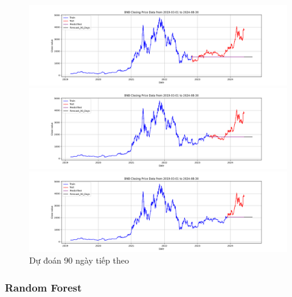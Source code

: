 \documentclass[conference]{IEEEtran}
\begin{document}
\begin{figure}[H]
    \centering
    \begin{minipage}{0.15\textwidth}
    \centering
    \includegraphics[width=1\textwidth]{Figure/ARIMA_ETH_90days_73.png}
    \end{minipage}
    \hfill
    \begin{minipage}{0.15\textwidth}
    \centering
    \includegraphics[width=1\textwidth]{Figure/ARIMA_ETH_90days_82.png}
    \end{minipage}
    \hfill
    \begin{minipage}{0.15\textwidth}
    \centering
    \includegraphics[width=1\textwidth]{Figure/ARIMA_ETH_90days_91.png}
    \end{minipage}
    \caption{Dự đoán 90 ngày tiếp theo}
    \label{fig:1}
\end{figure}



\subsubsection{Random Forest} 
\end{document}
